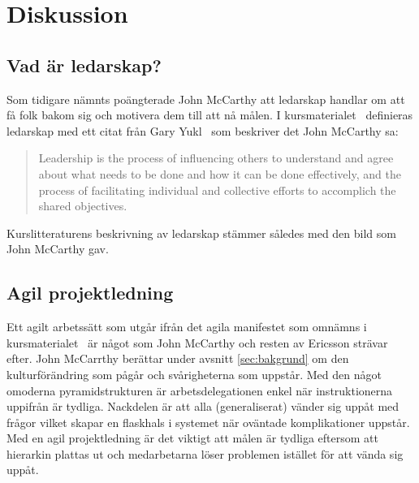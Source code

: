 \section{Diskussion}

\subsection{Vad är ledarskap?}
Som tidigare nämnts poängterade John McCarthy att ledarskap handlar om att få folk bakom sig och motivera dem till att nå målen. I kursmaterialet~\citep{leadership} definieras ledarskap med ett citat från Gary Yukl~\citep{yukl} som beskriver det John McCarthy sa:
\begin{quote}
Leadership is the process of influencing others to understand 
and agree about what needs to be done and how it can be 
done effectively, and the process of facilitating individual and 
collective efforts to accomplich the shared objectives.
\end{quote}

Kurslitteraturens beskrivning av ledarskap stämmer således med den bild som John McCarthy gav.

\subsection{Agil projektledning}
Ett agilt arbetssätt som utgår ifrån det agila manifestet som omnämns i kursmaterialet~\citep{projekt} är något som John McCarthy och resten av Ericsson strävar efter. John McCarrthy berättar under avsnitt \ref{sec:bakgrund} om den kulturförändring som pågår och svårigheterna som uppstår. Med den något omoderna pyramidstrukturen är arbetsdelegationen enkel när instruktionerna uppifrån är tydliga. Nackdelen är att alla (generaliserat) vänder sig uppåt med frågor vilket skapar en flaskhals i systemet när oväntade komplikationer uppstår. Med en agil projektledning är det viktigt att målen är tydliga eftersom att hierarkin plattas ut och medarbetarna löser problemen istället för att vända sig uppåt.
